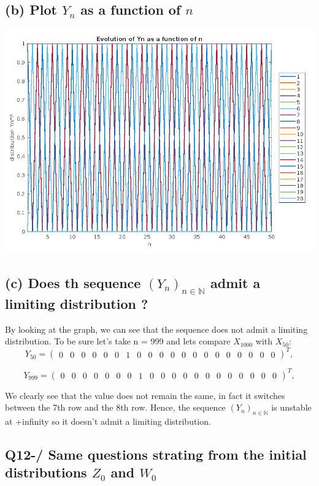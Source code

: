 \documentclass{article}
\begin{document}
    \subsection*{(b) Plot \( Y_n \) as a function of \( n \)}

    \includegraphics[width=\textwidth]{graph_Yn.png}

    \subsection*{(c) Does th sequence \( (Y_n)_{n \in \mathbb{N}} \) admit a limiting distribution ?}
    By looking at the graph, we can see that the sequence does not admit a limiting distribution. To be sure let's take n = 999 and lets compare \( X_{1000}\) with \( X_{50} \):
    \[
        Y_{50} = \begin{pmatrix}
                     0 & 0 & 0 & 0 & 0 & 0 & 1 & 0 & 0 & 0 & 0 & 0 & 0 & 0 & 0 & 0 & 0 & 0 & 0 & 0
        \end{pmatrix}^T,
    \]

    \[
        Y_{999} = \begin{pmatrix}
                      0 & 0 & 0 & 0 & 0 & 0 & 0 & 1 & 0 & 0 & 0 & 0 & 0 & 0 & 0 & 0 & 0 & 0 & 0 & 0
        \end{pmatrix}^T,
    \]

    We clearly see that the value does not remain the same, in fact it switches between the 7th row and the 8th row. Hence, the sequence \( (Y_n)_{n \in \mathbb{N}} \) is unstable at +infinity so it doesn't admit a limiting distribution.

    \subsection*{Q12-/ Same questions strating from the initial distributions \( Z_0 \) and \( W_0 \)}
\end{document}
